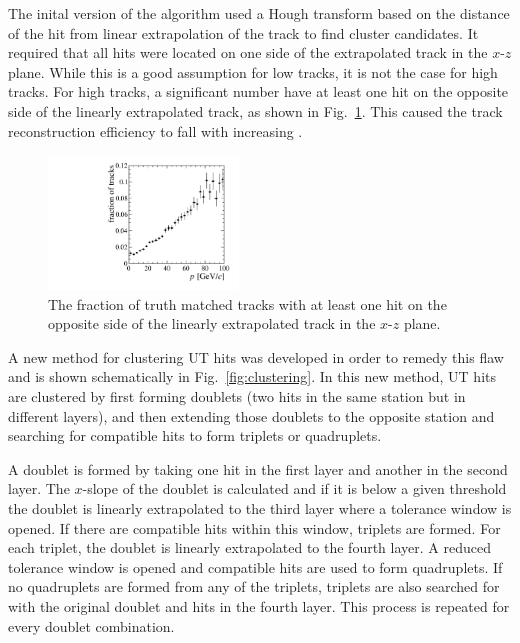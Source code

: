 The inital version of the \velout algorithm used a Hough transform based on the distance of the hit from linear extrapolation of the \velo track to find cluster candidates. It required that all hits were located on one side of the extrapolated \velo track in the $x$-$z$ plane. While this is a good assumption for low \ptot tracks, it is not the case for high \ptot tracks. For high \ptot tracks, a significant number have at least one hit on the opposite side of the linearly extrapolated \velo track, as shown in Fig.~\ref{fig:wrong_side_hits}. This caused the track reconstruction efficiency to fall with increasing \ptot.

\begin{figure}[!tb]
\centering
\includegraphics[width=0.45\textwidth]{figs/upstream-tracking-upgrade/wrong_side_hits.pdf}
\caption{The fraction of truth matched tracks with at least one hit on the opposite side of the linearly extrapolated \velo track in the $x$-$z$ plane.}
\label{fig:wrong_side_hits}
\end{figure}

A new method for clustering UT hits was developed in order to remedy this flaw and is shown schematically in Fig.~\ref{fig:clustering}. In this new method, UT hits are clustered by first forming doublets (two hits in the same station but in different layers), and then extending those doublets to the opposite station and searching for compatible hits to form triplets or quadruplets. 
 
A doublet is formed by taking one hit in the first layer and another in the second layer. The $x$-slope of the doublet is calculated and if it is below a given threshold the doublet is linearly extrapolated to the third layer where a tolerance window is opened. If there are compatible hits within this window, triplets are formed. For each triplet, the doublet is linearly extrapolated to the fourth layer. A reduced tolerance window is opened and compatible hits are used to form quadruplets. If no quadruplets are formed from any of the triplets, triplets are also searched for with the original doublet and hits in the fourth layer. This process is repeated for every doublet combination.
 
